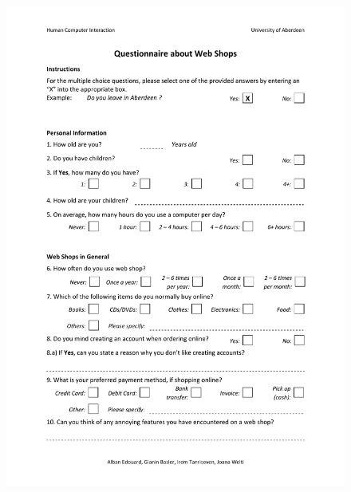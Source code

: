 \begin{figure}[h!]
\centering
\includegraphics[width=1.0\textwidth]{User_Involvement_Methods/Questionnaires/Questionnaire_Web_Shops_v3.pdf}
\end{figure}

